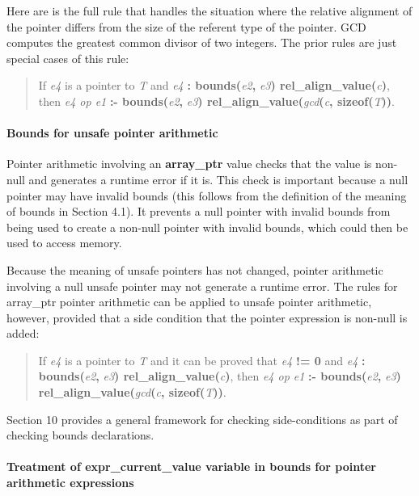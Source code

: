 \documentclass[]{article}
\let\oldparagraph\paragraph
\renewcommand{\paragraph}[1]{\oldparagraph{#1}\mbox{}}
\begin{document}
Here are is the full rule that handles the situation where the relative
alignment of the pointer differs from the size of the referent type of
the pointer. GCD computes the greatest common divisor of two integers.
The prior rules are just special cases of this rule:

\begin{quote}
If \emph{e4} is a pointer to \emph{T} and \emph{e4} \textbf{:
bounds(}\emph{e2}\textbf{,} \emph{e3}\textbf{)
rel\_align\_value(}\emph{c}\textbf{)}, then \emph{e4 op e1} \textbf{:-
bounds(}\emph{e2}\textbf{,} \emph{e3}\textbf{)
rel\_align\_value(}\emph{gcd}\textbf{(}\emph{c}\textbf{,
sizeof(}\emph{T}\textbf{))}.
\end{quote}

\paragraph{Bounds for unsafe pointer
arithmetic}\label{bounds-for-unsafe-pointer-arithmetic}

Pointer arithmetic involving an \textbf{array\_ptr} value checks that
the value is non-null and generates a runtime error if it is. This check
is important because a null pointer may have invalid bounds (this
follows from the definition of the meaning of bounds in Section 4.1). It
prevents a null pointer with invalid bounds from being used to create a
non-null pointer with invalid bounds, which could then be used to access
memory.

Because the meaning of unsafe pointers has not changed, pointer
arithmetic involving a null unsafe pointer may not generate a runtime
error. The rules for array\_ptr pointer arithmetic can be applied to
unsafe pointer arithmetic, however, provided that a side condition that
the pointer expression is non-null is added:

\begin{quote}
If \emph{e4} is a pointer to \emph{T} and it can be proved that
\emph{e4} \textbf{!= 0} and \emph{e4} \textbf{:
bounds(}\emph{e2}\textbf{,} \emph{e3}\textbf{)
rel\_align\_value(}\emph{c}\textbf{)}, then \emph{e4 op e1} \textbf{:-
bounds(}\emph{e2}\textbf{,} \emph{e3}\textbf{)
rel\_align\_value(}\emph{gcd}\textbf{(}\emph{c}\textbf{,
sizeof(}\emph{T}\textbf{))}.
\end{quote}

Section 10 provides a general framework for checking side-conditions as
part of checking bounds declarations.

\paragraph{Treatment of expr\_current\_value variable in bounds for
pointer arithmetic
expressions}\label{treatment-of-exprux5fcurrentux5fvalue-variable-in-bounds-for-pointer-arithmetic-expressions}
\end{document}
